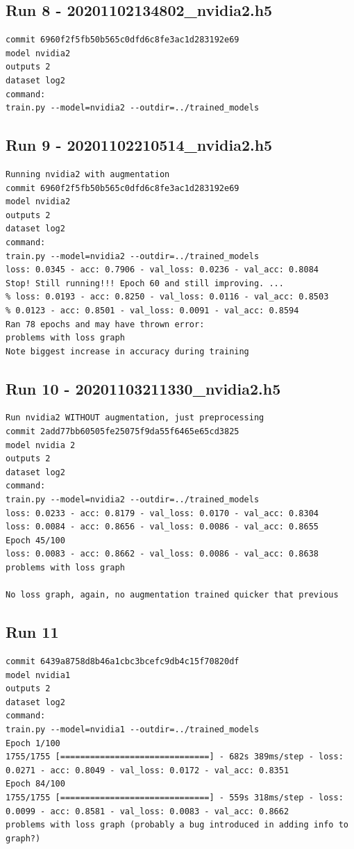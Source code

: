 \subsection{Run 8 - 20201102134802\_nvidia2.h5}
\begin{verbatim}
commit 6960f2f5fb50b565c0dfd6c8fe3ac1d283192e69
model nvidia2
outputs 2
dataset log2
command:
train.py --model=nvidia2 --outdir=../trained_models
\end{verbatim}


\subsection{Run 9 - 20201102210514\_nvidia2.h5}
\begin{verbatim}
Running nvidia2 with augmentation
commit 6960f2f5fb50b565c0dfd6c8fe3ac1d283192e69
model nvidia2
outputs 2
dataset log2
command:
train.py --model=nvidia2 --outdir=../trained_models
loss: 0.0345 - acc: 0.7906 - val_loss: 0.0236 - val_acc: 0.8084
Stop! Still running!!! Epoch 60 and still improving. ...
% loss: 0.0193 - acc: 0.8250 - val_loss: 0.0116 - val_acc: 0.8503
% 0.0123 - acc: 0.8501 - val_loss: 0.0091 - val_acc: 0.8594
Ran 78 epochs and may have thrown error:
problems with loss graph
Note biggest increase in accuracy during training
\end{verbatim}

\subsection{Run 10 - 20201103211330\_nvidia2.h5}
\begin{verbatim}
Run nvidia2 WITHOUT augmentation, just preprocessing
commit 2add77bb60505fe25075f9da55f6465e65cd3825
model nvidia 2
outputs 2
dataset log2
command:
train.py --model=nvidia2 --outdir=../trained_models
loss: 0.0233 - acc: 0.8179 - val_loss: 0.0170 - val_acc: 0.8304
loss: 0.0084 - acc: 0.8656 - val_loss: 0.0086 - val_acc: 0.8655
Epoch 45/100
loss: 0.0083 - acc: 0.8662 - val_loss: 0.0086 - val_acc: 0.8638
problems with loss graph

No loss graph, again, no augmentation trained quicker that previous

\end{verbatim}

\subsection{Run 11}
\begin{verbatim}
commit 6439a8758d8b46a1cbc3bcefc9db4c15f70820df
model nvidia1
outputs 2
dataset log2
command:
train.py --model=nvidia1 --outdir=../trained_models
Epoch 1/100
1755/1755 [==============================] - 682s 389ms/step - loss: 0.0271 - acc: 0.8049 - val_loss: 0.0172 - val_acc: 0.8351
Epoch 84/100
1755/1755 [==============================] - 559s 318ms/step - loss: 0.0099 - acc: 0.8581 - val_loss: 0.0083 - val_acc: 0.8662
problems with loss graph (probably a bug introduced in adding info to graph?)

\end{verbatim}

